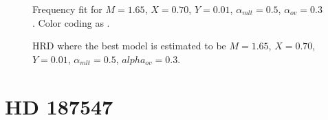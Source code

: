 \begin{figure}[htbp]
	\centering
	\caption{Frequency fit for $M=1.65$\msun, $X=0.70$, $Y=0.01$, $\alpha_{mlt} = 0.5$, $\alpha_{ov} = 0.3$. Color coding as . }
	\label{freqfit}
\end{figure}
\begin{figure}[htbp]
	\centering
	\caption{HRD where the best model is estimated to be $M=1.65$\msun, $X=0.70$, $Y=0.01$, $\alpha_{mlt} = 0.5$, $alpha_{ov} = 0.3$.}
	\label{hrd44old}
\end{figure}

\section{HD 187547}

